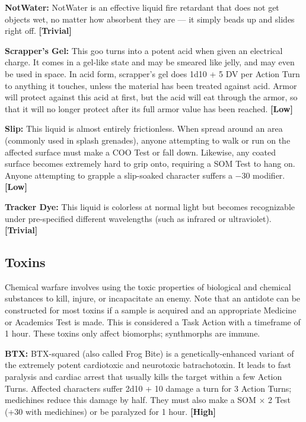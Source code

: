 \textbf{NotWater:} NotWater is an effective liquid fire retardant that does not get objects wet, no matter how absorbent they are --- it simply beads up and slides right off. \textbf{[Trivial]} 

\textbf{Scrapper’s Gel:} This goo turns into a potent acid when given an electrical charge. It comes in a gel-like state and may be smeared like jelly, and may even be used in space. In acid form, scrapper’s gel does 1d10 + 5 DV per Action Turn to anything it touches, unless the material has been treated against acid. Armor will protect against this acid at first, but the acid will eat through the armor, so that it will no longer protect after its full armor value has been reached. \textbf{[Low]} 

\textbf{Slip:} This liquid is almost entirely frictionless. When spread around an area (commonly used in splash grenades), anyone attempting to walk or run on the affected surface must make a COO Test or fall down. Likewise, any coated surface becomes extremely hard to grip onto, requiring a SOM Test to hang on. Anyone attempting to grapple a slip-soaked character suffers a $-$30 modifier. \textbf{[Low]} 

\textbf{Tracker Dye:} This liquid is colorless at normal light but becomes recognizable under pre-specified different wavelengths (such as infrared or ultraviolet). \textbf{[Trivial]} 



\subsection{Toxins} \label{sec:toxins} 

Chemical warfare involves using the toxic properties of biological and chemical substances to kill, injure, or incapacitate an enemy. Note that an antidote can be constructed for most toxins if a sample is acquired and an appropriate Medicine or Academics Test is made. This is considered a Task Action with a timeframe of 1 hour. These toxins only affect biomorphs; synthmorphs are immune. 

\textbf{BTX:} BTX-squared (also called Frog Bite) is a genetically-enhanced variant of the extremely potent cardiotoxic and neurotoxic batrachotoxin. It leads to fast paralysis and cardiac arrest that usually kills the target within a few Action Turns. Affected characters suffer 2d10 + 10 damage a turn for 3 Action Turns; medichines reduce this damage by half. They must also make a SOM $\times$ 2 Test (+30 with medichines) or be paralyzed for 1 hour. \textbf{[High]} 

